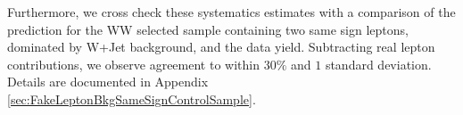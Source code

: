 Furthermore, we cross check these systematics estimates with a comparison of the prediction 
for the WW selected sample containing two same sign leptons, dominated by W+Jet
background, and the data yield. Subtracting real lepton contributions,
we observe agreement to within $30\%$ and $1$ standard deviation. Details
are documented in Appendix \ref{sec:FakeLeptonBkgSameSignControlSample}.



